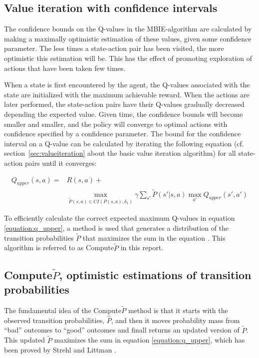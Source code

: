 \subsection{Value iteration with confidence intervals}
\label{sec:modification_conf_interval}

The confidence  bounds on the Q-values in the MBIE-algorithm are calculated by
making a maximally optimistic estimation of these values, given some confidence
parameter. The less times a state-action pair has been visited, the more
optimistic this estimation will be. This has the effect of promoting
exploration of actions that have been taken few times. 

When a state is first encountered by the agent, the Q-values associated with
the state are initialized with the maximum achievable reward. When the actions
are later performed, the state-action pairs have their Q-values gradually
decreased depending the expected value. Given time, the confidence bounds will
become smaller and smaller, and the policy will converge to optimal actions
with confidence specified by a confidence parameter. The bound for the
confidence interval on a Q-value can be calculated by iterating the following
equation (cf. section~\ref{sec:valueiteration} about the basic value iteration
algorithm) for all state-action pairs until it converges:

\begin{align}
\label{equation:q_upper}
Q_{upper} (s, a) = & R(s, a) + \nonumber \\
& \operatorname*{max}_{\tilde{P}(s, a)\in CI(P(s, a), \delta_1)} \gamma \sum_{s'} \tilde{P}(s'|s, a)\operatorname*{max}_{a'} Q_{upper}(s', a')
\end{align}


To efficiently calculate the correct expected maximum Q-values in equation \eqref{equation:q_upper}, a method is used that generates a distribution of the transition probabilities $\tilde{P}$ that maximizes the sum in the equation \parencite{Strehl20081309}. This algorithm is referred to as Compute$\tilde{P}$ in this report.


\subsection{Compute$\tilde{P}$, optimistic estimations of transition probabilities}

The fundamental idea of the Compute$\tilde{P}$ method is that it starts with the observed transition probabilities, $\hat{P}$, and then it moves probability mass from ``bad'' outcomes to ``good'' outcomes and finall returns an updated version of $\tilde{P}$. This updated $\tilde{P}$ maximizes the sum in equation \ref{equation:q_upper}, which has been proved by Strehl and Littman \parencite{Strehl20081309}.

